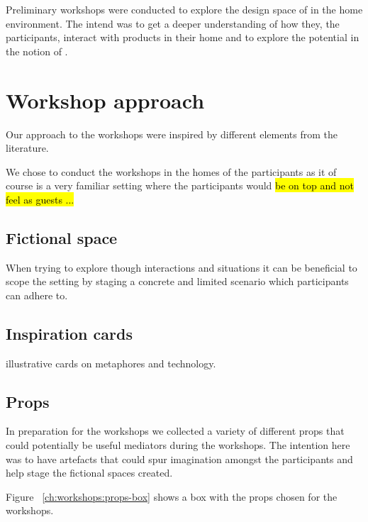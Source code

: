 Preliminary workshops were conducted to explore the design space of  in the home environment.
The intend was to get a deeper understanding of how they, the participants, interact with products in their home and to explore the potential in the notion of .

\section{Workshop approach}

Our approach to the workshops were inspired by different elements from the literature. \todo{\dots}

We chose to conduct the workshops in the homes of the participants as it of course is a very familiar setting where the participants would \hl{be on top and not feel as guests ...}

\subsection{Fictional space}


When trying to explore though interactions and situations it can be beneficial to scope the setting by staging a concrete and limited scenario which participants can adhere to.


\subsection{Inspiration cards}

illustrative cards on metaphores and technology.

\subsection{Props}


In preparation for the workshops we collected a variety of different props that could potentially be useful mediators during the workshops.
The intention here was to have artefacts that could spur imagination amongst the participants and help stage the fictional spaces created.

Figure ~\ref{ch:workshops:props-box} shows a box with the props chosen for the workshops.

